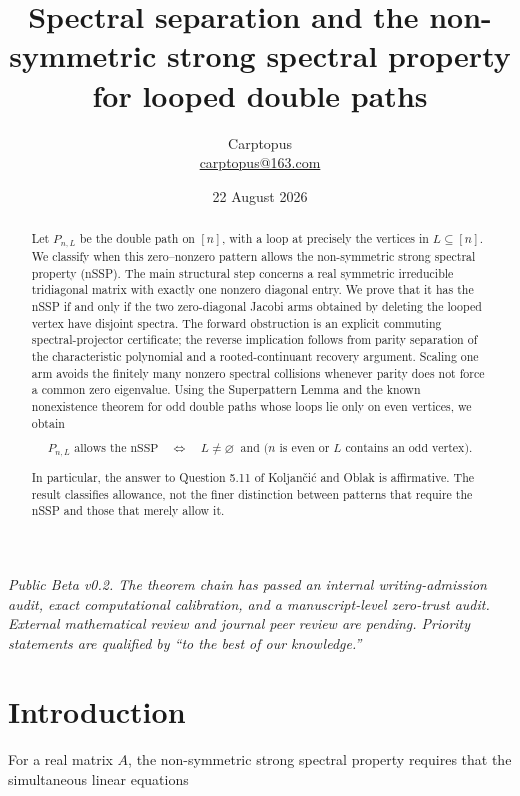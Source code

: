 \documentclass[11pt]{article}
\title{Spectral separation and the non-symmetric strong spectral property\\for looped double paths}
\author{Carptopus\\\href{mailto:carptopus@163.com}{carptopus@163.com}}
\date{22 August 2026}
\theoremstyle{remark}
\begin{document}
\maketitle

\begin{center}
\small\itshape
Public Beta v0.2. The theorem chain has passed an internal writing-admission audit,
exact computational calibration, and a manuscript-level zero-trust audit. External mathematical
review and journal peer review are pending. Priority statements are qualified by
``to the best of our knowledge.''
\end{center}
\vspace{0.8em}

\begin{abstract}


Let $P_{n,L}$ be the double path on $[n]$, with a loop at precisely the vertices in
$L\subseteq[n]$. We classify when this zero--nonzero pattern allows the non-symmetric strong spectral
property (nSSP). The main structural step concerns a real symmetric irreducible tridiagonal matrix with
exactly one nonzero diagonal entry. We prove that it has the nSSP if and only if the two zero-diagonal
Jacobi arms obtained by deleting the looped vertex have disjoint spectra. The forward obstruction is an
explicit commuting spectral-projector certificate; the reverse implication follows from parity separation
of the characteristic polynomial and a rooted-continuant recovery argument. Scaling one arm avoids the
finitely many nonzero spectral collisions whenever parity does not force a common zero eigenvalue. Using
the Superpattern Lemma and the known nonexistence theorem for odd double paths whose loops lie only on
even vertices, we obtain

\[
  P_{n,L}\text{ allows the nSSP}
  \quad\Longleftrightarrow\quad
  L\neq\varnothing\ \text{ and }\bigl(n\text{ is even or }L\text{ contains an odd vertex}\bigr).
\]

In particular, the answer to Question 5.11 of Koljan\v{c}i\'{c} and Oblak is affirmative. The result classifies
allowance, not the finer distinction between patterns that require the nSSP and those that merely allow it.

\end{abstract}

\section{Introduction}


For a real matrix $A$, the non-symmetric strong spectral property requires that the simultaneous
linear equations
\end{document}
